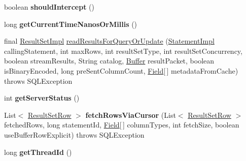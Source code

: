 \begin{DoxyCompactItemize}
\item 
\mbox{\label{classcom_1_1mysql_1_1jdbc_1_1_mysql_i_o_ad6340a0cc694b0de342d33f419a12d79}} 
boolean {\bfseries should\+Intercept} ()
\item 
\mbox{\label{classcom_1_1mysql_1_1jdbc_1_1_mysql_i_o_a81dc91eb94390a4956e26506e3567149}} 
long {\bfseries get\+Current\+Time\+Nanos\+Or\+Millis} ()
\item 
final \mbox{\hyperlink{classcom_1_1mysql_1_1jdbc_1_1_result_set_impl}{Result\+Set\+Impl}} \mbox{\hyperlink{classcom_1_1mysql_1_1jdbc_1_1_mysql_i_o_ae581885b9b18704a97106cc0992d1893}{read\+Results\+For\+Query\+Or\+Update}} (\mbox{\hyperlink{classcom_1_1mysql_1_1jdbc_1_1_statement_impl}{Statement\+Impl}} calling\+Statement, int max\+Rows, int result\+Set\+Type, int result\+Set\+Concurrency, boolean stream\+Results, String catalog, \mbox{\hyperlink{classcom_1_1mysql_1_1jdbc_1_1_buffer}{Buffer}} result\+Packet, boolean is\+Binary\+Encoded, long pre\+Sent\+Column\+Count, \mbox{\hyperlink{classcom_1_1mysql_1_1jdbc_1_1_field}{Field}}\mbox{[}$\,$\mbox{]} metadata\+From\+Cache)  throws S\+Q\+L\+Exception 
\item 
\mbox{\label{classcom_1_1mysql_1_1jdbc_1_1_mysql_i_o_ac1c93c4a047efd777572e1739e678df8}} 
int {\bfseries get\+Server\+Status} ()
\item 
\mbox{\label{classcom_1_1mysql_1_1jdbc_1_1_mysql_i_o_aa81d2e6a1068990608de84c4b2341d59}} 
List$<$ \mbox{\hyperlink{classcom_1_1mysql_1_1jdbc_1_1_result_set_row}{Result\+Set\+Row}} $>$ {\bfseries fetch\+Rows\+Via\+Cursor} (List$<$ \mbox{\hyperlink{classcom_1_1mysql_1_1jdbc_1_1_result_set_row}{Result\+Set\+Row}} $>$ fetched\+Rows, long statement\+Id, \mbox{\hyperlink{classcom_1_1mysql_1_1jdbc_1_1_field}{Field}}\mbox{[}$\,$\mbox{]} column\+Types, int fetch\+Size, boolean use\+Buffer\+Row\+Explicit)  throws S\+Q\+L\+Exception 
\item 
\mbox{\label{classcom_1_1mysql_1_1jdbc_1_1_mysql_i_o_ae867a013a643e65fe891bc90baf93971}} 
long {\bfseries get\+Thread\+Id} ()
\item 
\mbox{\label{classcom_1_1mysql_1_1jdbc_1_1_mysql_i_o_ac2781004ba351ce7e299f6de7f11cf28}} 

\end{DoxyCompactItemize}
